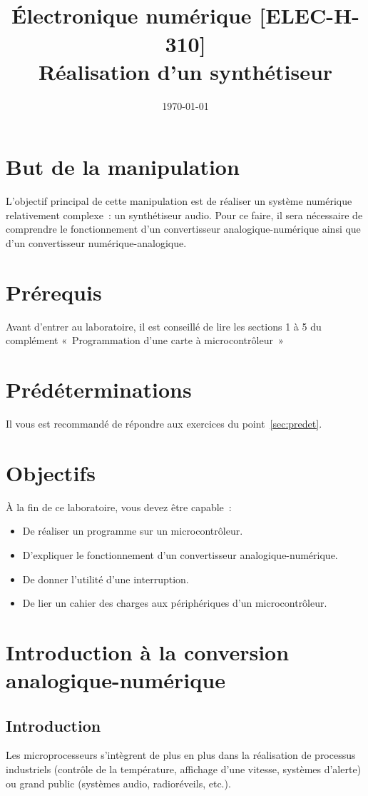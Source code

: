 \documentclass[11pt,a4paper]{article}
\date{\vspace{-1.7cm}\mydate\today}
\title{\vspace{-2cm} \labonumber\\ Électronique numérique [ELEC-H-310]\\Réalisation d'un synthétiseur\ifthenelse{\boolean{corrige}}{~\\Corrigé}{}}
\theoremstyle{definition}%
\begin{document}
\pagestyle{empty}
\maketitle
\section*{But de la manipulation}
L'objectif principal de cette manipulation est de réaliser un système numérique relativement complexe~: un synthétiseur audio.
Pour ce faire, il sera nécessaire de comprendre le fonctionnement d’un convertisseur analogique-numérique ainsi que d’un convertisseur numérique-analogique.

\section*{Prérequis}
Avant d’entrer au laboratoire, il est conseillé de lire les sections 1 à 5 du complément «~Programmation d’une carte à microcontrôleur~»

\section*{Prédéterminations}
Il vous est recommandé de répondre aux exercices du point~\ref{sec:predet}.

\section*{Objectifs}
À la fin de ce laboratoire, vous devez être capable~:
\begin{itemize}
	\item De réaliser un programme sur un microcontrôleur.
	\item D’expliquer le fonctionnement d’un convertisseur analogique-numérique.
	\item De donner l’utilité d’une interruption.
	\item De lier un cahier des charges aux périphériques d’un microcontrôleur.
\end{itemize}


\newpage{}

\section{Introduction à la conversion analogique-numérique}

\subsection{Introduction}
Les microprocesseurs s’intègrent de plus en plus dans la réalisation de processus industriels (contrôle de la température, affichage d’une vitesse, systèmes d’alerte) ou grand public (systèmes audio, radioréveils, etc.).
\end{document}
